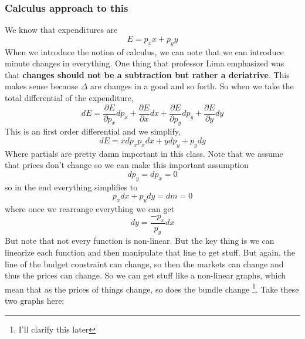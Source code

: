 \documentclass{article}
\begin{document}
\subsubsection{Calculus approach to this}
We know that expenditures are
\[
E = p_x x + p_y y 
\]
When we introduce the notion of calculus, we can note that we can introduce minute changes in everything. One thing that professor Lima emphasized was that \textbf{changes should not be a subtraction but rather a deriatrive}. This makes sense because $\Delta$ are changes in a good and so forth. So when we take the total differential of the expenditure, 
\[
dE = \frac{\partial E }{\partial p_x} dp_x + \frac{\partial E}{\partial x} dx + \frac{\partial E}{\partial p_y}dp_y + \frac{\partial E}{\partial y}dy
\]
This is an first order differential and we simplify,
\[
dE = xdp_x p_xdx + ydp_y + p_ydy
\]
Where partials are pretty damn important in this class. Note that we assume that prices don't change so we can make this important assumption
\[
dp_y = dp_x = 0
\]
so in the end everything simplifies to 
\[
p_xdx + p_ydy = dm = 0 
\]
where once we rearrange everything we can get
\[
dy = \frac{-p_x}{p_y} dx
\]
But note that not every function is non-linear. But the key thing is we can linearize each function and then manipulate that line to get stuff. But again, the line of the budget constraint can change, so then the markets can change and thus the prices can change. So we can get stuff like a non-linear graphs, which mean that as the prices of things change, so does the bundle change \footnote{I'll clarify this later}. Take these two graphs here:
\end{document}
